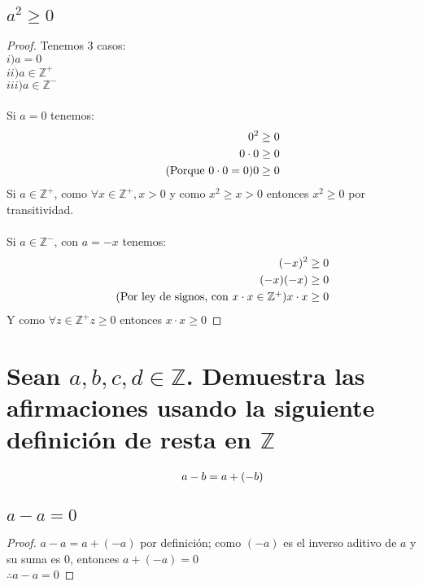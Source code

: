 \documentclass[12pt]{article}
\begin{document}
	    \subsection{$a^2 \geq 0$}
	        \begin{proof}
    	        Tenemos 3 casos: \\
	            $i) a=0$ \\
	            $ii) a \in \mathbb{Z^+}$ \\
	            $iii) a \in \mathbb{Z^-}$ \\ \\
	            Si $a=0$ tenemos: \\
	            \begin{align}
	                \notag 0^2 &\geq 0 \\
	                \notag0\cdot0 &\geq 0 \\
	                \tag{Porque $0\cdot0 = 0$}0 &\geq 0
	            \end{align}
	            Si $a \in \mathbb{Z^+}$, como $\forall x \in \mathbb{Z^+}, x > 0$ y como $x^2 \geq x > 0$ entonces $x^2 \geq 0$ por transitividad. \\ \\
                Si $a \in \mathbb{Z^-}$, con $a=-x$ tenemos: \\
                \begin{align}
                    \notag (-x)^2 &\geq 0 \\
                    \notag (-x)(-x) &\geq 0 \\
                    \tag{Por ley de signos, con $x\cdot x \in \mathbb{Z^+}$} x\cdot x &\geq 0
                \end{align}
                Y como $\forall z \in \mathbb{Z^+} z \geq 0$ entonces $x\cdot x \geq 0$ \blacksquare
	        \end{proof}
	\section{Sean $a,b,c,d \in \mathbb{Z}$. Demuestra las afirmaciones usando la siguiente definición de resta en $\mathbb{Z}$}
	\begin{align}\notag \qquad a-b = a+(-b)\end{align}
	    \subsection{$ a-a = 0$}
	        \begin{proof}
	          $a - a = a + (-a)$ por definición; como $(-a)$ es el inverso aditivo de $a$ y su suma es $0$, entonces $a + (-a) = 0$ \\
	        $\therefore a - a = 0$ \blacksquare
	        \end{proof}
\end{document}
